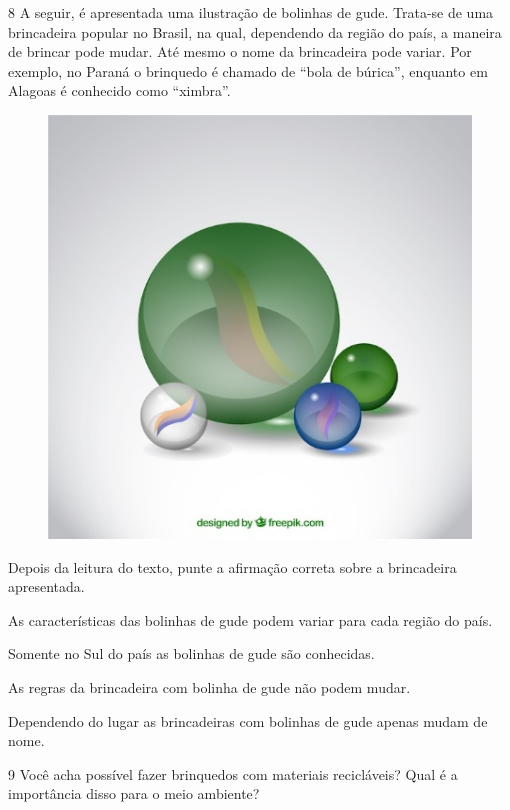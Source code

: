 
\num{8} A seguir, é apresentada uma ilustração de bolinhas de gude. Trata-se de uma
  brincadeira popular no Brasil, na qual, dependendo da região do país, a
  maneira de brincar pode mudar. Até mesmo o nome da brincadeira pode variar. Por exemplo, no Paraná o brinquedo é chamado de “bola de búrica”, enquanto em Alagoas
  é conhecido como “ximbra”.

\begin{figure}
\includegraphics[width=.2\textwidth]{./imgs/img10.jpg}
\end{figure}

\noindent{}Depois da leitura do texto, punte a afirmação correta sobre a
brincadeira apresentada.

\begin{escolha}
\item
  As características das bolinhas de gude podem variar para cada região
  do país.
\item
  Somente no Sul do país as bolinhas de gude são conhecidas.
\item
  As regras da brincadeira com bolinha de gude não podem mudar.
\item
  Dependendo do lugar as brincadeiras com bolinhas de gude apenas mudam
  de nome.
\end{escolha}


\num{9} Você acha possível fazer brinquedos com materiais recicláveis? Qual é a importância disso para o meio ambiente?


